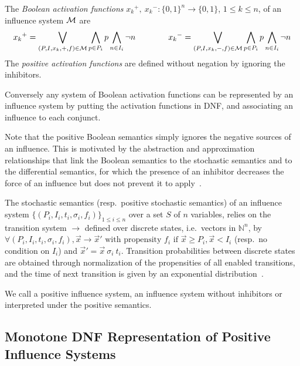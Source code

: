 \documentclass{llncs}
\newcommand{\lra}{\longrightarrow}
\begin{document}
\begin{definition}\label{def:activation}
The \emph{Boolean activation functions} ${x_k}^+,\ {x_k}^-:{\{0,1\}}^n \rightarrow\{0,1\}$, $1 \leq k \leq n$,
of an influence system $\cal M$ are
$${x_k}^+=\bigvee_{(P,I,x_k,+,f)\in\cal M} \bigwedge_{p\in P_i} p\bigwedge_{n\in I_i} \neg n
\qquad\qquad
{x_k}^-=\bigvee_{(P,I,x_k,-,f)\in\cal M} \bigwedge_{p\in P_i} p\bigwedge_{n\in I_i} \neg n$$
The \emph{positive activation functions} are defined without negation by ignoring the inhibitors.
\end{definition}

Conversely any system of Boolean activation functions can be represented by an influence system
by putting the activation functions in DNF, and associating an influence to each conjunct.

Note that the positive Boolean semantics simply ignores the negative sources of an influence.
This is motivated by the abstraction and approximation relationships that link the Boolean semantics
to the stochastic semantics and to the differential semantics, for which the presence of an inhibitor decreases the force of an influence but does not prevent it to apply~\cite{FMRS16cmsb}.


\begin{definition}\label{def:stoch}
   The stochastic semantics (resp.~positive stochastic semantics) of an influence system $\{(P_i, I_i, t_i,
   \sigma_i, f_i)\}_{1\leq i\leq n}$ over a set $S$ of $n$ variables, relies
   on the transition system $\lra$ defined over discrete states, i.e.\
   vectors in $\mathbb{N}^n$, by $\forall (P_i, I_i, t_i, \sigma_i, f_i), {\vec
   x}\lra{\vec x'} \text{ with propensity }f_i\text{ if }{\vec x}\geq P_i,
   {\vec x}<I_i$ (resp.~no condition on $I_i$) and ${\vec x'} = {\vec x}\  \sigma_i\ t_i$.
   Transition probabilities between discrete states are obtained through
   normalization of the propensities of all enabled transitions, and the time
   of next transition is given by an exponential distribution~\cite{Gillespie77jpc}.
\end{definition}

We call a positive influence system, an influence system without inhibitors or interpreted under the positive semantics.

\subsection{Monotone DNF Representation of Positive Influence Systems}
\end{document}
